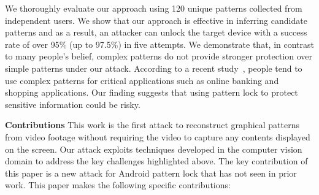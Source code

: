 We thoroughly evaluate our approach using 120 unique patterns collected from independent users. We show that our approach is effective in inferring candidate patterns and as a result, an attacker can unlock
the target device with a success rate of over 95\% (up to 97.5\%) in five attempts.
We demonstrate that, in contrast to many people's belief, complex patterns do not provide stronger protection over simple patterns under our attack. According to a recent study~\cite{alpnorway}, people tend to use complex
patterns for critical applications such as online banking and shopping applications.
Our finding suggests that using pattern lock to protect sensitive information could be risky.
%

\vspace{3mm}
\noindent \textbf{Contributions} This work is the first attack to reconstruct graphical patterns from video footage without requiring the video to capture any contents displayed on the screen.
Our attack exploits techniques developed in the computer vision domain to address the key challenges highlighted above.
The key contribution of this paper is a new attack for Android pattern lock that has not seen in prior work. This paper makes the following specific contributions:

